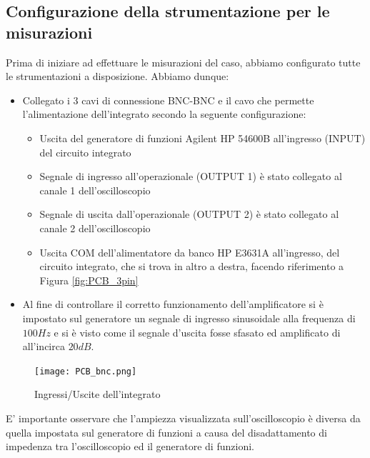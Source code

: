 \subsection{Configurazione della strumentazione per le misurazioni}
Prima di iniziare ad effettuare le misurazioni del caso, abbiamo configurato tutte le strumentazioni a disposizione. Abbiamo dunque:
\begin{itemize}
    \item Collegato i 3 cavi di connessione BNC-BNC e il cavo che permette l'alimentazione dell'integrato secondo la seguente configurazione:
    \begin{itemize}
        \item Uscita del generatore di funzioni Agilent HP 54600B all'ingresso (INPUT) del circuito integrato
        \item  Segnale di ingresso all'operazionale (OUTPUT 1) è stato collegato al canale 1 dell'oscilloscopio
        \item  Segnale di uscita dall'operazionale (OUTPUT 2) è stato collegato al canale 2 dell'oscilloscopio
        \item Uscita COM dell'alimentatore da banco HP E3631A all'ingresso, del circuito integrato, che si trova in altro a destra, facendo riferimento a Figura \ref{fig:PCB_3pin}
    \end{itemize}
    \item Al fine di controllare il corretto funzionamento dell'amplificatore si è impostato sul generatore un segnale di ingresso sinusoidale alla frequenza di $100Hz$ e si è visto come il segnale d'uscita fosse sfasato ed amplificato di all'incirca $20dB$.  
\end{itemize}
\begin{figure}[h]
        \centering
        \texttt{[image: PCB\_bnc.png]}
        \caption{Ingressi/Uscite dell'integrato}
        \label{fig:pcb_bnc}
    \end{figure}
\FloatBarrier
E' importante osservare che l'ampiezza visualizzata sull'oscilloscopio è diversa da quella impostata sul generatore di funzioni a causa del disadattamento di impedenza tra l'oscilloscopio ed il generatore di funzioni.
